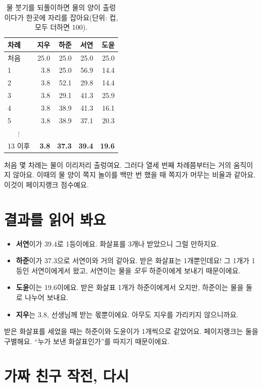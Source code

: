 \begin{table}[h]
\centering
\small
\begin{tabular}{@{}lrrrr@{}}
\toprule
차례 & 지우 & 하준 & 서연 & 도윤 \\
\midrule
처음 & 25.0 & 25.0 & 25.0 & 25.0 \\
1 & 3.8 & 25.0 & 56.9 & 14.4 \\
2 & 3.8 & 52.1 & 29.8 & 14.4 \\
3 & 3.8 & 29.1 & 41.3 & 25.9 \\
4 & 3.8 & 38.9 & 41.3 & 16.1 \\
5 & 3.8 & 38.9 & 37.1 & 20.3 \\
\multicolumn{1}{c}{$\vdots$} & & & & \\
13 이후 & \textbf{3.8} & \textbf{37.3} & \textbf{39.4} & \textbf{19.6} \\
\bottomrule
\end{tabular}
\caption{물 붓기를 되풀이하면 물의 양이 출렁이다가 한곳에 자리를 잡아요(단위: 컵, 모두 더하면 100).}
\end{table}

처음 몇 차례는 물이 이리저리 출렁여요.
그러다 열세 번째 차례쯤부터는 거의 움직이지 않아요.
이때의 물 양이 쪽지 놀이를 백만 번 했을 때 쪽지가 머무는 비율과 같아요.
이것이 페이지랭크 점수예요.

\section{결과를 읽어 봐요}

\begin{itemize}
\item \textbf{서연}이가 39.4로 1등이에요. 화살표를 3개나 받았으니 그럴 만하지요.
\item \textbf{하준}이가 37.3으로 서연이와 거의 같아요. 받은 화살표는 1개뿐인데요!
      그 1개가 1등인 서연이에게서 왔고, 서연이는 물을 \emph{모두} 하준이에게 보내기 때문이에요.
\item \textbf{도윤}이는 19.6이에요. 받은 화살표 1개가 하준이에게서 오지만, 하준이는 물을 둘로 나누어 보내요.
\item \textbf{지우}는 3.8, 선생님께 받는 몫뿐이에요. 아무도 지우를 가리키지 않으니까요.
\end{itemize}

받은 화살표를 세었을 때는 하준이와 도윤이가 1개씩으로 같았어요.
페이지랭크는 둘을 구별해요.
“누가 보낸 화살표인가”를 따지기 때문이에요.

\section{가짜 친구 작전, 다시}

